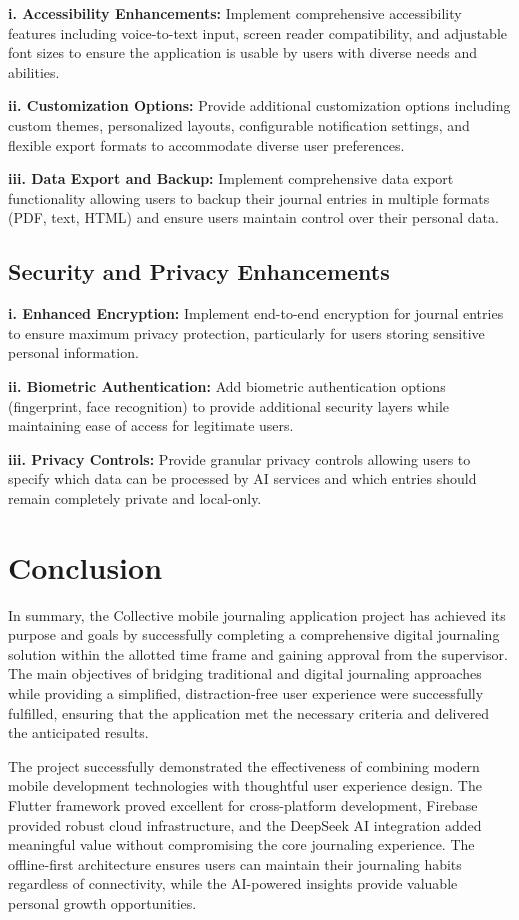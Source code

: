 \textbf{i. Accessibility Enhancements:} Implement comprehensive accessibility features including voice-to-text input, screen reader compatibility, and adjustable font sizes to ensure the application is usable by users with diverse needs and abilities.

\textbf{ii. Customization Options:} Provide additional customization options including custom themes, personalized layouts, configurable notification settings, and flexible export formats to accommodate diverse user preferences.

\textbf{iii. Data Export and Backup:} Implement comprehensive data export functionality allowing users to backup their journal entries in multiple formats (PDF, text, HTML) and ensure users maintain control over their personal data.

\subsection{Security and Privacy Enhancements}

\textbf{i. Enhanced Encryption:} Implement end-to-end encryption for journal entries to ensure maximum privacy protection, particularly for users storing sensitive personal information.

\textbf{ii. Biometric Authentication:} Add biometric authentication options (fingerprint, face recognition) to provide additional security layers while maintaining ease of access for legitimate users.

\textbf{iii. Privacy Controls:} Provide granular privacy controls allowing users to specify which data can be processed by AI services and which entries should remain completely private and local-only.

\section{Conclusion}\label{sec:conclusion}

In summary, the Collective mobile journaling application project has achieved its purpose and goals by successfully completing a comprehensive digital journaling solution within the allotted time frame and gaining approval from the supervisor. The main objectives of bridging traditional and digital journaling approaches while providing a simplified, distraction-free user experience were successfully fulfilled, ensuring that the application met the necessary criteria and delivered the anticipated results.

The project successfully demonstrated the effectiveness of combining modern mobile development technologies with thoughtful user experience design. The Flutter framework proved excellent for cross-platform development, Firebase provided robust cloud infrastructure, and the DeepSeek AI integration added meaningful value without compromising the core journaling experience. The offline-first architecture ensures users can maintain their journaling habits regardless of connectivity, while the AI-powered insights provide valuable personal growth opportunities.

